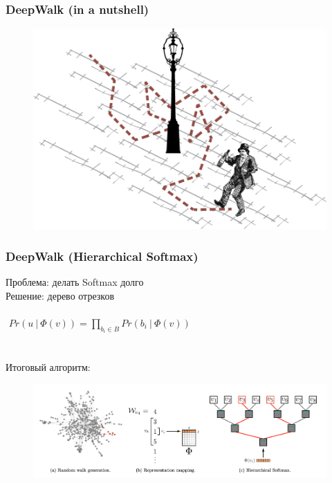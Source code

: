\documentclass{beamer}
\newcommand{\skipline}[0]{$ $\\}
\begin{document}
\begin{frame}
    \frametitle{DeepWalk (in a nutshell)}
    \begin{figure}
        \includegraphics[width=1\columnwidth]{randomwalk.png}
    \end{figure}
\end{frame}

\begin{frame}
    \frametitle{DeepWalk (Hierarchical Softmax)}
    Проблема: делать Softmax долго
    \skipline
    Решение: дерево отрезков 
    \skipline
    \skipline
    $ $\hspace*{4ex} 
    $
    Pr\left(u \ \vert\ \varPhi(v)\right) = 
    \prod_{b_i \in B} Pr\left(b_i \ \vert\ \varPhi(v)\right)
    $ 
    \skipline
    \skipline
    \skipline
    Итоговый алгоритм:
    \begin{figure}
        \includegraphics[width=1\columnwidth]{DeepWalk.png}
    \end{figure}
\end{frame}
\end{document}
